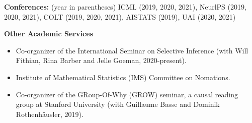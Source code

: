 \documentclass{article}
\begin{document}
\vspace{2mm}
\noindent \textbf{Conferences: }(year in parentheses) ICML (2019, 2020, 2021), NeurlPS (2019, 2020, 2021), COLT (2019, 2020, 2021), AISTATS (2019), UAI (2020, 2021)

\vspace{7mm}
\begin{large}
\noindent \textbf{Other Academic Services}
\end{large}

\begin{itemize}
\item Co-organizer of the International Seminar on Selective Inference (with Will Fithian, Rina Barber and Jelle Goeman, 2020-present).
\item Institute of Mathematical Statistics (IMS) Committee on Nomations.
\item Co-organizer of the GRoup-Of-Why (GROW) seminar, a causal reading group at Stanford University (with Guillaume Basse and Dominik Rothenhäusler, 2019).
\end{itemize}
\end{document}
